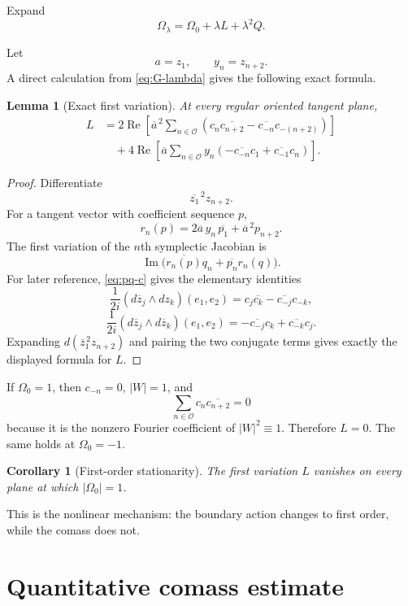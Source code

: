 \documentclass[11pt]{article}
\newtheorem{lemma}[theorem]{Lemma}
\newtheorem{corollary}[theorem]{Corollary}
\begin{document}
Expand
\[
        \Omega_\lambda
        =
        \Omega_0+\lambda L+\lambda^2Q.
\]

Let
\[
        a=z_1,\qquad y_n=z_{n+2}.
\]
A direct calculation from \eqref{eq:G-lambda} gives the following exact
formula.

\begin{lemma}[Exact first variation]\label{lem:firstvar}
At every regular oriented tangent plane,
\[
\begin{aligned}
 L
 &=
 2\operatorname{Re}\left[
 \overline a^{\,2}
 \sum_{n\in\mathcal O}
 \left(
 c_n\overline{c_{n+2}}
 -
 \overline{c_{-n}}c_{-(n+2)}
 \right)
 \right]\\
 &\quad+
 4\operatorname{Re}\left[
 \overline a
 \sum_{n\in\mathcal O}
 y_n
 \left(
 -\overline{c_{-n}}c_1
 +\overline{c_{-1}}c_n
 \right)
 \right].
\end{aligned}
\]
\end{lemma}

\begin{proof}
Differentiate
\[
        \overline{z_1}^{\,2}z_{n+2}.
\]
For a tangent vector with coefficient sequence $p$,
\[
        r_n(p)
        =
        2\overline a\,y_n\,\overline{p_1}
        +\overline a^{\,2}p_{n+2}.
\]
The first variation of the $n$th symplectic Jacobian is
\[
 \operatorname{Im}
 \bigl(\overline{r_n(p)}q_n+\overline{p_n}r_n(q)\bigr).
\]
For later reference, \eqref{eq:pq-c} gives the elementary identities
\[
 \frac1{2i}(d\overline z_j\wedge dz_k)(e_1,e_2)
 =c_j\overline{c_k}-\overline{c_{-j}}c_{-k},
\]
\[
 \frac1{2i}(d\overline z_j\wedge d\overline z_k)(e_1,e_2)
 =-\overline{c_{-j}}c_k+\overline{c_{-k}}c_j.
\]
Expanding
$d(\overline z_1^{\,2}z_{n+2})$ and pairing the two conjugate terms gives
exactly the displayed formula for $L$.
\end{proof}

If $\Omega_0=1$, then $c_{-n}=0$, $|W|=1$, and
\[
 \sum_{n\in\mathcal O}c_n\overline{c_{n+2}}=0
\]
because it is the nonzero Fourier coefficient of $|W|^2\equiv1$.
Therefore $L=0$.  The same holds at $\Omega_0=-1$.

\begin{corollary}[First-order stationarity]\label{cor:stationary}
The first variation $L$ vanishes on every plane at which
$|\Omega_0|=1$.
\end{corollary}

This is the nonlinear mechanism: the boundary action changes to first
order, while the comass does not.

\section{Quantitative comass estimate}
\end{document}
